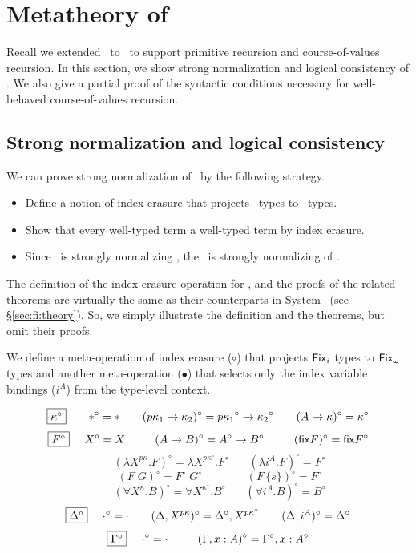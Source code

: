 \section{Metatheory of \Fixi} \label{sec:fixi:theory}
Recall we extended \Fixw\ to \Fixi\ to support primitive recursion and
course-of-values recursion. In this section, we show strong normalization and
logical consistency of \Fixi. We also give a partial proof of
the syntactic conditions necessary for well-behaved course-of-values recursion.

\subsection{Strong normalization and logical consistency}
\label{ssec:fixi:theory:sn}
We can prove strong normalization of \Fixi\ by the following strategy.
\begin{itemize}
\item Define a notion of index erasure that
	projects \Fixi\ types to \Fixw\ types.
\item Show that every well-typed \Fixi term a well-typed \Fixw term
	by index erasure.
\item Since \Fixw\ is strongly normalizing \cite{AbeMat04}, the
	\Fixi\ is strongly normalizing of \Fixi.
\end{itemize}

The definition of the index erasure operation for \Fixi, and the proofs of
the related theorems are virtually the same as their counterparts
in System \Fi\ (see \S\ref{sec:fi:theory}). So, we simply illustrate
the definition and the theorems, but omit their proofs.

We define a meta-operation of index erasure ($\circ$) that
projects $\Fixi$ types to $\Fixw$ types and another meta-operation ($\bullet$)
that selects only the index variable bindings ($i^A$) from
the type-level context.
\begin{definition}\label{def:Fixierase}
\[ \fbox{$\kappa^\circ$}
 ~~~~ ~~
 *^\circ =
 *
 ~~~~ ~~
 (p\kappa_1 -> \kappa_2)^\circ =
 p{\kappa_1}^\circ -> {\kappa_2}^\circ
 ~~~~ ~~
 (A -> \kappa)^\circ =
 \kappa^\circ
\]
\[ \fbox{$F^\circ$}
 ~~~~
 X^\circ =
 X
 ~~~~ ~~~~
 (A -> B)^\circ =
 A^\circ -> B^\circ
 ~~~~ ~~~~
 (\mathsf{fix} F)^\circ =
 \mathsf{fix} F^\circ
\]
\[ \qquad
 (\lambda X^{p\kappa}.F)^\circ =
 \lambda X^{p\kappa^\circ}.F^\circ
 ~~~~ ~~~~
 (\lambda i^A.F)^\circ =
 F^\circ
\]
\[ \qquad
 (F\;G)^\circ =
 F^\circ\;G^\circ
 ~~~~ ~~~~ ~~~~ ~~~~ ~~
 (F\,\{s\})^\circ =
 F^\circ
\]
\[ \qquad
 (\forall X^\kappa . B)^\circ =
 \forall X^{\kappa^\circ} . B^\circ
 ~~~~ ~~~~
 (\forall i^A . B)^\circ =
 B^\circ
\]
\[ \fbox{$\Delta^\circ$}
 ~~~~
 \cdot^\circ = \cdot
 ~~~~ ~~
 (\Delta,X^{p\kappa})^\circ = \Delta^\circ,X^{p\kappa^\circ}
 ~~~~ ~~
 (\Delta,i^A)^\circ = \Delta^\circ
\]
\[ \fbox{$\Gamma^\circ$}
 ~~~~
 \cdot^\circ = \cdot
 ~~~~ ~~~~
 (\Gamma,x:A)^\circ = \Gamma^\circ,x:A^\circ
\]
\end{definition}

